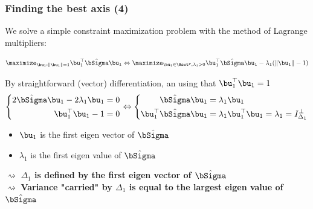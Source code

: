 \documentclass{beamer}\usepackage[]{graphicx}\usepackage[]{color}
\begin{document}
\begin{frame}
  \frametitle{Finding the best axis (4)}

  We solve a simple constraint maximization problem with the method of Lagrange multipliers:
  
  \begin{equation*}
    \maximize_{\bu_1: \|\bu_1\| = 1 } \bu_1^\top \hat\bSigma \bu_1 \Leftrightarrow \maximize_{\bu_1\in\Rset^p, \lambda_1 > 0} \bu_1^\top \hat\bSigma \bu_1 - \lambda_1 (\|\bu_1\| - 1)
  \end{equation*}
  
  By straightforward (vector) differentiation, an using that $\bu_1^\top \bu_1 = 1$
  \begin{equation*}
    \left\{\begin{aligned}
      2\hat\bSigma \bu_1 - 2\lambda_1 \bu_1 & = 0 \\  
      \bu_1^\top \bu_1 - 1 & = 0 \\  
    \end{aligned}\right. \Leftrightarrow
    \left\{\begin{aligned}
      \hat\bSigma \bu_1 & = \lambda_1 \bu_1  \\  
      \bu_1^\top \hat\bSigma \bu_1 & = \lambda_1 \bu_1^\top \bu_1 = \lambda_1 = I_{\Delta_1}^\bot \\  
    \end{aligned}\right.
  \end{equation*}
  
  \begin{itemize} 
     \item $\bu_1$ is the first eigen vector of $\hat{\bSigma}$
     \item $\lambda_1$ is the first eigen value of $\hat{\bSigma}$
   \end{itemize} 
  
  $\rightsquigarrow$ \alert{\bf $\Delta_1$ is defined by the first eigen vector of $\hat\bSigma$}\\
  $\rightsquigarrow$ \alert{\bf Variance "carried" by $\Delta_1$ is equal to the largest eigen value of $\hat\bSigma$}
  
\end{frame}
\end{document}

